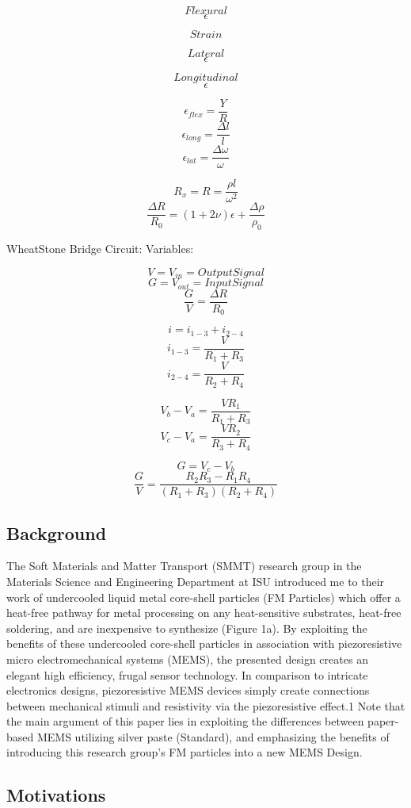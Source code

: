 \documentclass[12pt]{article}
\begin{document}
$$Flexural$$ $$\epsilon$$

$$Strain$$

 $$Lateral$$ $$\epsilon$$

$$Longitudinal$$ $$\epsilon$$

$$\epsilon_{flex}=\frac{Y}{R}$$
$$\epsilon_{long}=\frac{\Delta\textit{l}}{\textit{l}}$$
$$\epsilon_{lat}=\frac{\Delta\omega}{\omega}$$

$$R_x=R=\frac{\rho\textit{l}}{\omega^{2}}$$
$$\frac{\Delta R}{R_0}=(1+2\nu)\epsilon+\frac{\Delta \rho}{\rho_0}$$

WheatStone Bridge Circuit:
Variables: 

$$V=V_{in}=Output Signal$$
$$G=V_{out}=Input Signal$$
$$\frac{G}{V}=\frac{\Delta R}{R_0}$$


$$i=i_{1-3}+i_{2-4}$$
$$i_{1-3}=\frac{V}{R_1+R_3}$$
$$i_{2-4}=\frac{V}{R_2+R_4}$$

$$V_b-V_a=\frac{VR_1}{R_1+R_3}$$
$$V_c-V_a=\frac{VR_2}{R_3+R_4}$$

$$G=V_c-V_b$$
$$\frac{G}{V}=\frac{R_2R_3-R_1R_4}{(R_1+R_3)(R_2+R_4)}$$







\subsection{Background}
The Soft Materials and Matter Transport (SMMT) research group in the Materials Science and Engineering Department at ISU introduced me to their work of undercooled liquid metal core-shell particles (FM Particles) which offer a heat-free pathway for metal processing on any heat-sensitive substrates, heat-free soldering, and are inexpensive to synthesize (Figure 1a). By exploiting the benefits of these undercooled core-shell particles in association with piezoresistive micro electromechanical systems (MEMS), the presented design creates an elegant high efficiency, frugal sensor technology. In comparison to intricate electronics designs, piezoresistive MEMS devices simply create connections between mechanical stimuli and resistivity via the piezoresistive effect.1 Note that the main argument of this paper lies in exploiting the differences between paper-based MEMS utilizing silver paste (Standard), and emphasizing the benefits of introducing this research group’s FM particles into a new MEMS Design.


\subsection{Motivations}
\end{document}
